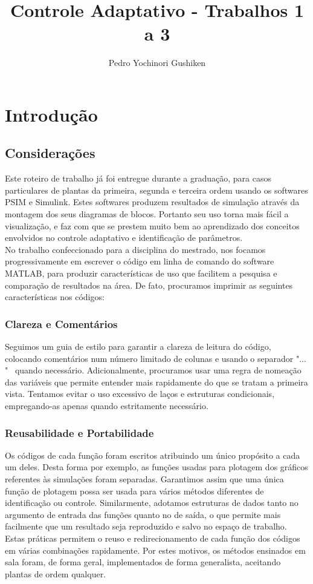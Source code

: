\documentclass[11pt]{report}
\title{Controle Adaptativo -  Trabalhos 1 a 3}
\author{Pedro Yochinori Gushiken}
\begin{document}
\maketitle
%

\chapter*{Introdução}


\section*{Considerações}

Este roteiro de trabalho já foi entregue durante a graduação, para casos particulares de plantas da primeira, segunda e terceira ordem usando os softwares PSIM e Simulink. Estes softwares produzem resultados de simulação através da montagem dos seus diagramas de blocos. Portanto seu uso torna mais fácil a visualização, e faz com que se prestem muito bem ao aprendizado dos conceitos envolvidos no controle adaptativo e identificação de parâmetros.\\

 No trabalho confeccionado para a disciplina do mestrado, nos focamos progressivamente em escrever o código em linha de comando do software MATLAB,  para produzir características de uso que facilitem a pesquisa e comparação de resultados na área. De fato, procuramos imprimir as seguintes características nos códigos:  

\subsection*{Clareza e Comentários}
Seguimos um guia de estilo para garantir a clareza de leitura do código, colocando comentários num número limitado de colunas e usando o separador "$...$"~ quando necessário. Adicionalmente, procuramos usar uma regra de nomeação das variáveis que permite entender mais rapidamente do que se tratam a primeira vista. Tentamos evitar o uso excessivo de laços e estruturas condicionais, empregando-as apenas quando estritamente necessário.


\subsection*{Reusabilidade e Portabilidade}
Os códigos de cada função foram escritos atribuindo um único propósito a cada um deles. Desta forma por exemplo, as funções usadas para plotagem dos gráficos referentes às simulações foram separadas. Garantimos assim que uma única função de plotagem possa ser usada para vários métodos diferentes de identificação ou controle. Similarmente, adotamos estruturas de dados tanto no argumento de entrada das funções quanto no de saída, o que permite mais facilmente que um resultado seja reproduzido e salvo no espaço de trabalho. Estas práticas permitem o reuso e redirecionamento de cada função dos códigos em várias combinações rapidamente. Por estes motivos, os métodos ensinados em sala foram, de forma geral, implementados de forma generalista, aceitando plantas de ordem qualquer.
\end{document}
